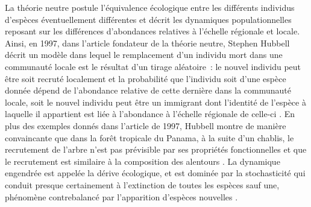 La théorie neutre postule l'équivalence écologique entre les différents
individus d'espèces éventuellement différentes et décrit les dynamiques
populationnelles reposant sur les différences d'abondances relatives à
l'échelle régionale et locale. Ainsi, en 1997, dans l'article fondateur
de la théorie neutre, Stephen Hubbell décrit un modèle dans lequel le
remplacement d'un individu mort dans une communauté locale est le
résultat d'un tirage aléatoire~: le nouvel individu peut être soit
recruté localement et la probabilité que l'individu soit d'une espèce
donnée dépend de l'abondance relative de cette dernière dans la
communauté locale, soit le nouvel individu peut être un immigrant dont
l'identité de l'espèce à laquelle il appartient est liée à l'abondance à
l'échelle régionale de celle-ci \citep{Hubbell1997}. En plus des
exemples donnés dans l'article de 1997, Hubbell montre de manière
convaincante que dans la forêt tropicale du Panama, à la suite d'un
chablis, le recrutement de l'arbre n'est pas prévisible par ses
propriétés fonctionnelles et que le recrutement est similaire à la
composition des alentours \citep{Hubbell1999}. La dynamique engendrée
est appelée la dérive écologique, et est dominée par la stochasticité
qui conduit presque certainement à l'extinction de toutes les espèces
sauf une, phénomène contrebalancé par l'apparition d'espèces nouvelles
\citep{Hubbell2010, Ricklefs2003}.

